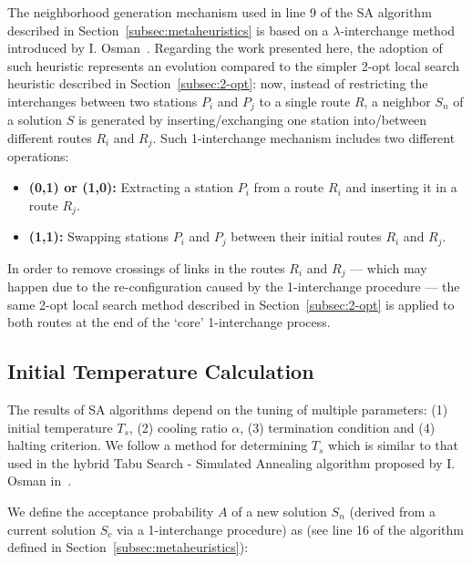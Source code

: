 The neighborhood generation mechanism used in line 9 of the SA algorithm 
described in Section~\ref{subsec:metaheuristics} is based on 
a $\lambda$-interchange method introduced by 
I. Osman~\cite{Osman1993,Thangiahl1996,Toth2002}. Regarding the work presented 
here, the 
adoption of such heuristic represents an evolution compared to the 
simpler 2-opt local search heuristic described in Section~\ref{subsec:2-opt}: 
now, instead of restricting the interchanges between two stations $P_i$ and 
$P_j$ to a single route $R$, a neighbor $S_n$ of a solution $S$ is 
generated by inserting\slash exchanging one station into\slash between 
different routes $R_i$ and $R_j$. Such 1-interchange mechanism includes two 
different operations:

\begin{itemize}

    \item \textbf{(0,1) or (1,0):} Extracting a station $P_i$ from a route 
        $R_i$ and inserting it in a route $R_j$.
    \item \textbf{(1,1):} Swapping stations $P_i$ and $P_j$ between their 
        initial routes $R_i$ and $R_j$.

\end{itemize}\vertbreak

In order to remove crossings of links in the routes $R_i$ and $R_j$ --- which 
may happen due to the re-configuration caused by the 1-interchange 
procedure --- the same 2-opt local search method described in 
Section~\ref{subsec:2-opt} is applied to both routes at the end of the `core' 
1-interchange process.\vertbreak

\subsection{Initial Temperature Calculation}
\label{subsec:cooling}

The results of SA algorithms depend on the tuning of multiple parameters: (1) 
initial temperature $T_s$, (2) cooling ratio $\alpha$, (3) termination 
condition and (4) halting criterion. We follow a method for determining $T_s$ 
which is similar to that used in the hybrid Tabu Search - Simulated 
Annealing algorithm proposed by I. Osman in~\cite{Osman1993}.\vertbreak

We define the acceptance probability $A$ of a new solution $S_n$ (derived from a 
current solution 
$S_c$ via a 1-interchange procedure) as (see line 16 of the algorithm defined 
in Section~\ref{subsec:metaheuristics}):

